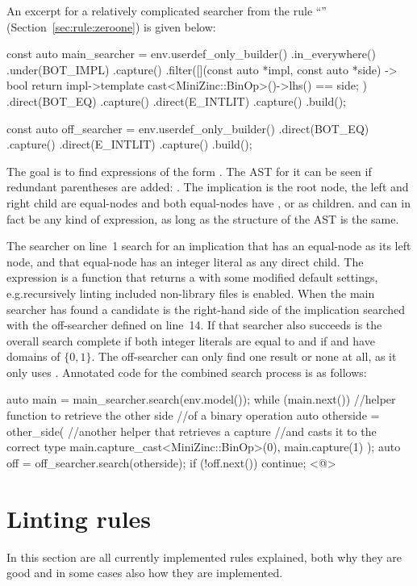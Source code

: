 \documentclass[a4paper,12pt]{article}
\newcommand{\ruleref}[1]{``\nameref{sec:rule:#1}'' (Section~\ref{sec:rule:#1})}
\begin{document}
An excerpt for a relatively complicated searcher from the rule \ruleref{zeroone} is given
below:
\begin{cppp}
const auto main_searcher = env.userdef_only_builder()
  .in_everywhere()
  .under(BOT_IMPL)
  .capture()
  .filter([](const auto *impl, const auto *side) -> bool {
    return impl->template cast<MiniZinc::BinOp>()->lhs() == side;
  })
  .direct(BOT_EQ)
  .capture()
  .direct(E_INTLIT)
  .capture()
  .build();

const auto off_searcher = env.userdef_only_builder()
  .direct(BOT_EQ)
  .capture()
  .direct(E_INTLIT)
  .capture()
  .build();
\end{cppp}

The goal is to find expressions of the form .
The AST for it can be seen if redundant parentheses are added: .
The implication is the root node, the left and right child are equal-nodes and both
equal-nodes have ,  or  as children.  and  can in fact be
any kind of expression, as long as the structure of the AST is the same.

The searcher on line~1 search for an implication that has an equal-node as its left node,
and that equal-node has an integer literal as any direct child. The expression
 is a function that returns a  with some
modified default settings, e.g.\@ recursively linting included non-library files is enabled.
When the main searcher has found a candidate is the right-hand side of the implication
searched with the off-searcher defined on line~14. If that searcher also succeeds is the
overall search complete if both integer literals are equal to  and if  and
 have domains of $\{0,1\}$. The off-searcher can only find one result or none at
all, as it only uses . Annotated code for the combined search process is as follows:
\begin{cppp}
auto main = main_searcher.search(env.model());
while (main.next()) {
  //helper function to retrieve the other side
  //of a binary operation
  auto otherside = other_side(
    //another helper that retrieves a capture
    //and casts it to the correct type
    main.capture_cast<MiniZinc::BinOp>(0),
    main.capture(1)
    );
  auto off = off_searcher.search(otherside);
  if (!off.next())
    continue;
  <@\vdots@>
}
\end{cppp}

\section{Linting rules}\label{sec:rules}
In this section are all currently implemented rules explained, both why they are good
and in some cases also how they are implemented.
\end{document}
